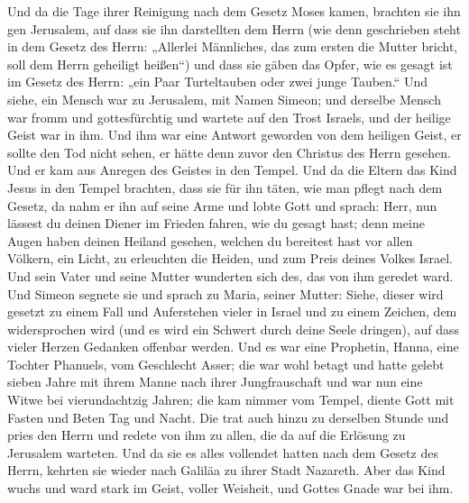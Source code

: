  Und da die Tage ihrer Reinigung nach dem Gesetz Moses
kamen, brachten sie ihn gen Jerusalem, auf dass sie ihn darstellten dem
Herrn  (wie denn geschrieben steht in dem Gesetz des
Herrn: „Allerlei Männliches, das zum ersten die Mutter bricht, soll dem
Herrn geheiligt heißen``)  und dass sie gäben das Opfer,
wie es gesagt ist im Gesetz des Herrn: „ein Paar Turteltauben oder zwei
junge Tauben.``  Und siehe, ein Mensch war zu Jerusalem,
mit Namen Simeon; und derselbe Mensch war fromm und gottesfürchtig und
wartete auf den Trost Israels, und der heilige Geist war in ihm.
 Und ihm war eine Antwort geworden von dem heiligen
Geist, er sollte den Tod nicht sehen, er hätte denn zuvor den Christus
des Herrn gesehen.  Und er kam aus Anregen des Geistes in
den Tempel. Und da die Eltern das Kind Jesus in den Tempel brachten,
dass sie für ihn täten, wie man pflegt nach dem Gesetz, 
da nahm er ihn auf seine Arme und lobte Gott und sprach: 
Herr, nun lässest du deinen Diener im Frieden fahren, wie du gesagt
hast;  denn meine Augen haben deinen Heiland gesehen,
 welchen du bereitest hast vor allen Völkern,
 ein Licht, zu erleuchten die Heiden, und zum Preis
deines Volkes Israel.  Und sein Vater und seine Mutter
wunderten sich des, das von ihm geredet ward.  Und Simeon
segnete sie und sprach zu Maria, seiner Mutter: Siehe, dieser wird
gesetzt zu einem Fall und Auferstehen vieler in Israel und zu einem
Zeichen, dem widersprochen wird  (und es wird ein Schwert
durch deine Seele dringen), auf dass vieler Herzen Gedanken offenbar
werden.  Und es war eine Prophetin, Hanna, eine Tochter
Phanuels, vom Geschlecht Asser; die war wohl betagt und hatte gelebt
sieben Jahre mit ihrem Manne nach ihrer Jungfrauschaft 
und war nun eine Witwe bei vierundachtzig Jahren; die kam nimmer vom
Tempel, diente Gott mit Fasten und Beten Tag und Nacht. 
Die trat auch hinzu zu derselben Stunde und pries den Herrn und redete
von ihm zu allen, die da auf die Erlösung zu Jerusalem warteten.
 Und da sie es alles vollendet hatten nach dem Gesetz des
Herrn, kehrten sie wieder nach Galiläa zu ihrer Stadt Nazareth.
 Aber das Kind wuchs und ward stark im Geist, voller
Weisheit, und Gottes Gnade war bei ihm.

